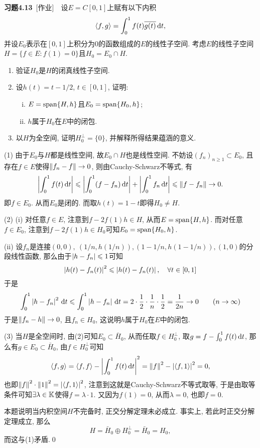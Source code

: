     \textbf{习题4.13}\ [作业]\ \ 设$ E=C[0,1] $上赋有以下内积
    \[
    \left\langle f,g \right\rangle=\int_0^1f(t)\overline{g(t)}\,\mathrm{d} t,
    \]
    并设$ E_0 $表示在$ [0,1] $上积分为0的函数组成的$ E $的线性子空间. 考虑$ E $的线性子空间$ H=\{ f\in E : f(1)=0 \} $且$ H_0=E_0\cap H $.
    \begin{enumerate}[(1)]
    \item 验证$ H_0 $是$ H $的闭真线性子空间.
    \item 设$ h(t)=t-1/2 $, $ t\in[0,1] $, 证明:
    \begin{enumerate}[(i)]
    \item $ E=\operatorname{span}\{H,h\} $且$ E_0=\operatorname{span}\{H_0,h\} $;
    \item $ h $属于$ H_0 $在$ E $中的闭包.
    \end{enumerate}
    \item 以$ H $为全空间, 证明$ H_0^\bot=\{0\} $, 并解释所得结果蕴涵的意义.
    \end{enumerate}
    \begin{Proof}
    (1) 由于$ E_0 $与$ H $都是线性空间, 故$ E_0\cap H $也是线性空间. 不妨设$ (f_n)_{n\geqslant 1}\subset E_0 $, 且存在$ f\in E $使得$ \left\| f_n-f \right\|\to 0 $, 则由Cauchy-Schwarz不等式, 有
    \[
    \left| \int_0^1f(t)\,\mathrm{d} t \right| \leqslant\left| \int_0^1(f-f_n)\,\mathrm{d} t \right| +\left| \int_0^1f_n\,\mathrm{d} t \right| \leqslant\left\| f-f_n \right\|\to 0.
    \]
    即$ f\in E_0 $. 从而$ E_0 $是闭的. 而取$ h(t)=1-t $即得$ H_0\ne H $.
    
    (2) (i) 对任意$ f\in E $, 注意到$ f-2f(1)h\in H $, 从而$ E=\operatorname{span}\{ H,h \} $. 而对任意$ f\in E_0 $, 注意到$ f-2f(1)h\in H_0 $可知$ E_0=\operatorname{span}\{ H_0,h \} $.
    
    (ii) 设$ f_n $是连接$ (0,0),\ (1/n,h(1/n)), (1-1/n,h(1-1/n)), (1,0) $的分段线性函数, 那么由于$ \left| h-f_n \right| \leqslant 1 $可知
    \[
    \left| h(t)-f_n(t) \right| ^2\leqslant\left| h(t)-f_n(t) \right| ,\quad\forall t\in [0,1]
    \]
    于是
    \[
    \int_0^1\left| h-f_n \right| ^2\,\mathrm{d} t\leqslant\int_0^1\left| h-f_n \right| \,\mathrm{d} t=2\cdot\frac{1}{2}\cdot\frac{1}{n}\cdot\frac{1}{2}=\frac{1}{2n}\to 0\qquad (n\to\infty)
    \]
    于是$ \left\| f_n-h \right\|\to 0 $, 且$ f_n\in H_0 $, 这说明$ h $属于$ H_0 $在$ E $中的闭包.
    
    (3) 当$ H $是全空间时, 由(2)可知$ E_0\subset\bar{H}_0 $, 从而任取$ f\in H_0^\bot $, 取$ g=f-\int_0^1f(t)\,\mathrm{d} t $, 那么有$ g\in E_0\subset \bar{H}_0 $, 由$ f\in H_0^\bot $可知
    \[
    \left\langle f,g \right\rangle=\left\langle f,f \right\rangle-\left| \int_0^1f(t)\,\mathrm{d} t \right| ^2=\left\| f \right\|^2-\left| \left\langle f,1 \right\rangle \right| ^2=0,
    \]
    也即$ \left\| f \right\|^2\cdot\left\| 1 \right\|^2=\left| \left\langle f,1 \right\rangle \right| ^2 $, 注意到这就是Cauchy-Schwarz不等式取等, 于是由取等条件可知$ \exists\lambda\in\mathbb{K} $使得$ f=\lambda\cdot 1 $. 又因为$ f(1)=0 $, 从而$ \lambda=0 $, 也即$ f=0 $.
    
    本题说明当内积空间$ H $不完备时, 正交分解定理未必成立. 事实上, 若此时正交分解定理成立, 那么
    \[
    H=\bar{H}_0\oplus H_0^\bot=\bar{H}_0=H_0,
    \]
    而这与(1)矛盾.\qed
    \end{Proof}

